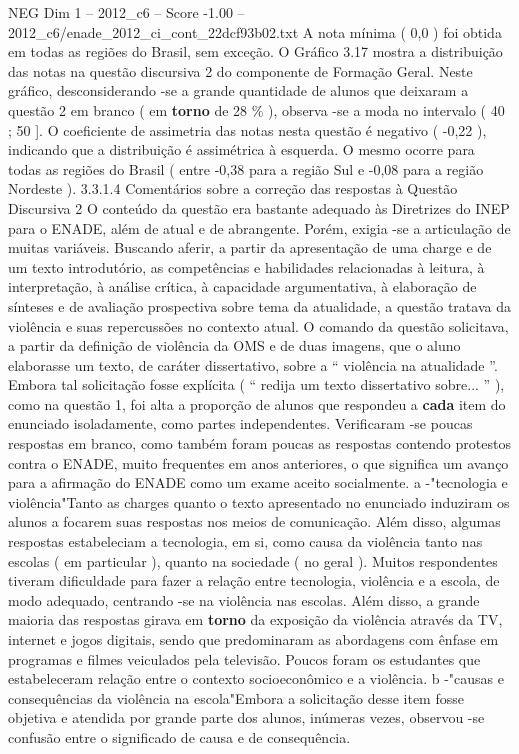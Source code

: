 \begin{textsample}{NEG Dim 1 – 2012\_c6 – Score -1.00 – 2012\_c6/enade\_2012\_ci\_cont\_22dcf93b02.txt}
A nota mínima ( 0,0 ) foi obtida em todas as regiões do Brasil, sem exceção.
O Gráfico 3.17 mostra a distribuição das notas na questão discursiva 2 do componente de Formação Geral.
Neste gráfico, desconsiderando -se a grande quantidade de alunos que deixaram a questão 2 em branco ( em \textbf{torno} de 28 \% ), observa -se a moda no intervalo ( 40 ; 50 ].
O coeficiente de assimetria das notas nesta questão é negativo ( -0,22 ), indicando que a distribuição é assimétrica à esquerda.
O mesmo ocorre para todas as regiões do Brasil ( entre -0,38 para a região Sul e -0,08 para a região Nordeste ). 3.3.1.4 Comentários sobre a correção das respostas à Questão Discursiva 2 O conteúdo da questão era bastante adequado às Diretrizes do INEP para o ENADE, além de atual e de abrangente.
Porém, exigia -se a articulação de muitas variáveis.
Buscando aferir, a partir da apresentação de uma charge e de um texto introdutório, as competências e habilidades relacionadas à leitura, à interpretação, à análise crítica, à capacidade argumentativa, à elaboração de sínteses e de avaliação prospectiva sobre tema da atualidade, a questão tratava da violência e suas repercussões no contexto atual.
O comando da questão solicitava, a partir da definição de violência da OMS e de duas imagens, que o aluno elaborasse um texto, de caráter dissertativo, sobre a “ violência na atualidade ”.
Embora tal solicitação fosse explícita ( “ redija um texto dissertativo sobre... ” ), como na questão 1, foi alta a proporção de alunos que respondeu a \textbf{cada} item do enunciado isoladamente, como partes independentes.
Verificaram -se poucas respostas em branco, como também foram poucas as respostas contendo protestos contra o ENADE, muito frequentes em anos anteriores, o que significa um avanço para a afirmação do ENADE como um exame aceito socialmente. a -"tecnologia e violência"Tanto as charges quanto o texto apresentado no enunciado induziram os alunos a focarem suas respostas nos meios de comunicação.
Além disso, algumas respostas estabeleciam a tecnologia, em si, como causa da violência tanto nas escolas ( em particular ), quanto na sociedade ( no geral ).
Muitos respondentes tiveram dificuldade para fazer a relação entre tecnologia, violência e a escola, de modo adequado, centrando -se na violência nas escolas.
Além disso, a grande maioria das respostas girava em \textbf{torno} da exposição da violência através da TV, internet e jogos digitais, sendo que predominaram as abordagens com ênfase em programas e filmes veiculados pela televisão.
Poucos foram os estudantes que estabeleceram relação entre o contexto socioeconômico e a violência. b -"causas e consequências da violência na escola"Embora a solicitação desse item fosse objetiva e atendida por grande parte dos alunos, inúmeras vezes, observou -se confusão entre o significado de causa e de consequência.

\end{textsample}
